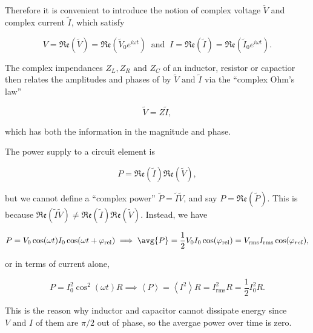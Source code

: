 \documentclass[english,a4paper,12pt]{report}
\begin{document}
Therefore it is convenient to introduce the notion of complex voltage \(\tilde{V} \) and complex current \(\tilde{I} \), which satisfy 

\begin{equation}
    V = \mathfrak{Re} (\tilde{V} ) = \mathfrak{Re} (\tilde{V}_{0}  e^{i \omega t} ) ~\text { and }~ I = \mathfrak{Re} (\tilde{I} ) = \mathfrak{Re} (\tilde{I}_{0} e^{i \omega t}  ).    
\end{equation}

The complex impendances \(Z_{L}, Z_{R} \text { and } Z_{C}  \) of an inductor, resistor or capactior then relates the amplitudes and phases of by \(\tilde{V}  \text { and }  \tilde{I}\) via the ``complex Ohm's law''

\begin{equation}
    \tilde{V} = Z \tilde{I},
\end{equation}

which has both the information in the magnitude and phase.

The power supply to a circuit element is 

\begin{equation}
    P = \mathfrak{Re} (\tilde{I} )\mathfrak{Re} (\tilde{V} ),
\end{equation}

but we cannot define a ``complex power'' \(\tilde{P} = \tilde{I} \tilde{V}   \), and say \(P = \mathfrak{Re} (\tilde{P} ) \). This is because \(\mathfrak{Re} (\tilde{I} \tilde{V}  ) \neq \mathfrak{Re} (\tilde{I} ) \mathfrak{Re} (\tilde{V} )  \). Instead, we have 

\begin{equation}
    P = V_0 \cos (\omega t) I_0 \cos (\omega t+ \varphi _{\text{rel} } ) \implies \avg{P} = \frac{1}{2}V_0 I_0 \cos (\varphi _{\text{rel} }) = V_{\text{rms} }I_{\text{rms} }\cos (\varphi _{rel}),
\end{equation}

or in terms of current alone,

\begin{equation}
    P = I_0 ^2 \cos ^2(\omega t) R \implies \left \langle {P} \right \rangle = \left \langle {I^2} \right \rangle R = I_{\text{rms} }^2R = \frac{1}{2} I_0 ^2R . 
\end{equation}

This is the reason why inductor and capacitor cannot dissipate energy since \(V \text { and } I\) of them are \(\pi /2 \) out of phase, so the avergae power over time is zero.  
\end{document}
